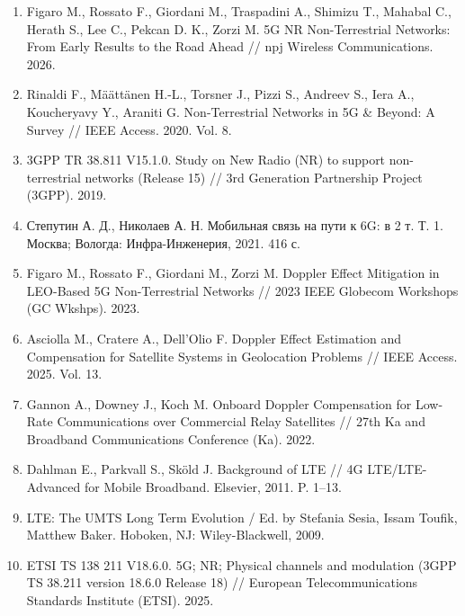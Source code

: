 \begin{enumerate}
    \item \label{Figaro2026}
    Figaro M., Rossato F., Giordani M., Traspadini A., Shimizu T., Mahabal C., Herath S., Lee C., Pekcan D. K., Zorzi M. 5G NR Non-Terrestrial Networks: From Early Results to the Road Ahead // npj Wireless Communications. 2026.
    
    \item \label{Rinaldi2020}
    Rinaldi F., Määttänen H.-L., Torsner J., Pizzi S., Andreev S., Iera A., Koucheryavy Y., Araniti G. Non-Terrestrial Networks in 5G & Beyond: A Survey // IEEE Access. 2020. Vol. 8.

    \item \label{TR38811}
    3GPP TR 38.811 V15.1.0. Study on New Radio (NR) to support non-terrestrial networks (Release 15) // 3rd Generation Partnership Project (3GPP). 2019.

    \item \label{steputin20216g_v1} 
    Степутин А. Д., Николаев А. Н. Мобильная связь на пути к 6G: в 2 т. Т. 1. Москва; Вологда: Инфра-Инженерия, 2021. 416 с.

    \item \label{Figaro2023}
    Figaro M., Rossato F., Giordani M., Zorzi M. Doppler Effect Mitigation in LEO-Based 5G Non-Terrestrial Networks // 2023 IEEE Globecom Workshops (GC Wkshps). 2023.

    \item \label{Asciolla2025}
    Asciolla M., Cratere A., Dell’Olio F. Doppler Effect Estimation and Compensation for Satellite Systems in Geolocation Problems // IEEE Access. 2025. Vol. 13.

    \item \label{Gannon2022}
    Gannon A., Downey J., Koch M. Onboard Doppler Compensation for Low-Rate Communications over Commercial Relay Satellites // 27th Ka and Broadband Communications Conference (Ka). 2022.

    \item \label{Dahlman2011} 
    Dahlman E., Parkvall S., Sk\"{o}ld J. Background of LTE // 4G LTE/LTE-Advanced for Mobile Broadband. Elsevier, 2011. P. 1–13.

    \item \label{Sesia2009} 
    LTE: The UMTS Long Term Evolution / Ed. by Stefania Sesia, Issam Toufik, Matthew Baker. Hoboken, NJ: Wiley-Blackwell, 2009.

    \item \label{TS138211}
    ETSI TS 138 211 V18.6.0. 5G; NR; Physical channels and modulation (3GPP TS 38.211 version 18.6.0 Release 18) // European Telecommunications Standards Institute (ETSI). 2025.


\end{enumerate}
